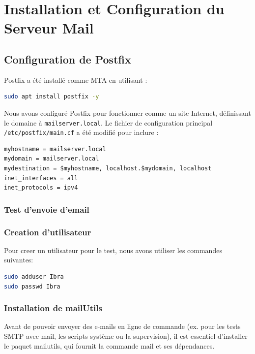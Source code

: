 \documentclass[a4paper,12pt]{article}
\begin{document}
\section{Installation et Configuration du Serveur Mail}

\subsection{Configuration de Postfix}
Postfix a été installé comme MTA en utilisant :
\begin{lstlisting}[language=bash]
sudo apt install postfix -y
\end{lstlisting}
Nous avons configuré Postfix pour fonctionner comme un site Internet, définissant le domaine à \texttt{mailserver.local}. Le fichier de configuration principal \texttt{/etc/postfix/main.cf} a été modifié pour inclure :
\begin{lstlisting}
myhostname = mailserver.local
mydomain = mailserver.local
mydestination = $myhostname, localhost.$mydomain, localhost
inet_interfaces = all
inet_protocols = ipv4
\end{lstlisting}

\subsubsection{Test d'envoie d'email}
\subsubsection*{Creation d'utilisateur}
Pour creer un utilisateur pour le test, nous avons utiliser les commandes suivantes:
\begin{lstlisting}[language=bash]
sudo adduser Ibra
sudo passwd Ibra
\end{lstlisting}



\subsubsection{Installation de mailUtils}

Avant de pouvoir envoyer des e-mails en ligne de commande (ex. pour les tests SMTP avec mail, les scripts système ou la supervision), il est essentiel d’installer le paquet mailutils, qui fournit la commande mail et ses dépendances.
\end{document}
